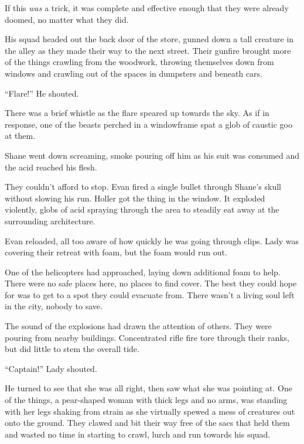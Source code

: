 If this \emph{was} a trick, it was complete and effective enough that they were already doomed, no matter what they did.



His squad headed out the back door of the store, gunned down a tall creature in the alley as they made their way to the next street.  Their gunfire brought more of the things crawling from the woodwork, throwing themselves down from windows and crawling out of the spaces in dumpsters and beneath cars.



``Flare!''  He shouted.



There was a brief whistle as the flare speared up towards the sky.  As if in response, one of the beasts perched in a windowframe spat a glob of caustic goo at them.



Shane went down screaming, smoke pouring off him as his suit was consumed and the acid reached his flesh.



They couldn't afford to stop.  Evan fired a single bullet through Shane's skull without slowing his run.  Holler got the thing in the window.  It exploded violently, globs of acid spraying through the area to steadily eat away at the surrounding architecture.



Evan reloaded, all too aware of how quickly he was going through clips.  Lady was covering their retreat with foam, but the foam would run out.



One of the helicopters had approached, laying down additional foam to help.  There were no safe places here, no places to find cover.  The best they could hope for was to get to a spot they could evacuate from.  There wasn't a living soul left in the city, nobody to save.



The sound of the explosions had drawn the attention of others.  They were pouring from nearby buildings.  Concentrated rifle fire tore through their ranks, but did little to stem the overall tide.



``Captain!''  Lady shouted.



He turned to see that she was all right, then saw what she was pointing at.  One of the things, a pear-shaped woman with thick legs and no arms, was standing with her legs shaking from strain as she virtually spewed a mess of creatures out onto the ground.  They clawed and bit their way free of the sacs that held them and wasted no time in starting to crawl, lurch and run towards his squad.



